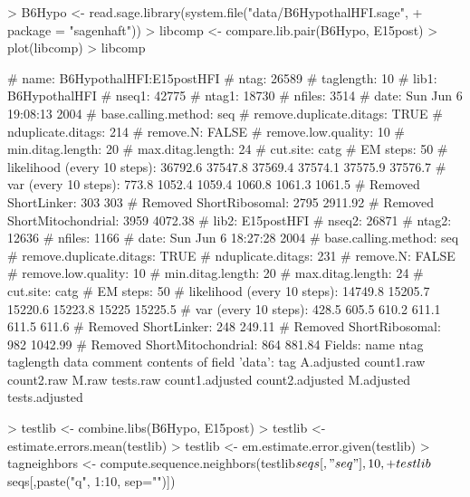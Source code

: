 \documentclass[12pt]{article}
\begin{document}
\begin{Schunk}
\begin{Soutput}
\end{Soutput}
\begin{Sinput}
> B6Hypo <- read.sage.library(system.file("data/B6HypothalHFI.sage", 
+     package = "sagenhaft"))
> libcomp <- compare.lib.pair(B6Hypo, E15post)
> plot(libcomp)
> libcomp
\end{Sinput}
\begin{Soutput}
# name: B6HypothalHFI:E15postHFI
# ntag: 26589
# taglength: 10
# lib1: B6HypothalHFI
# nseq1: 42775
# ntag1: 18730
# nfiles: 3514
# date: Sun Jun  6 19:08:13 2004
# base.calling.method: seq
# remove.duplicate.ditags: TRUE
# nduplicate.ditags: 214
# remove.N: FALSE
# remove.low.quality: 10
# min.ditag.length: 20
# max.ditag.length: 24
# cut.site: catg
# EM steps: 50
# likelihood (every 10 steps): 36792.6 37547.8 37569.4 37574.1 37575.9 37576.7
# var (every 10 steps): 773.8 1052.4 1059.4 1060.8 1061.3 1061.5
# Removed ShortLinker: 303 303
# Removed ShortRibosomal: 2795 2911.92
# Removed ShortMitochondrial: 3959 4072.38
# lib2: E15postHFI
# nseq2: 26871
# ntag2: 12636
# nfiles: 1166
# date: Sun Jun  6 18:27:28 2004
# base.calling.method: seq
# remove.duplicate.ditags: TRUE
# nduplicate.ditags: 231
# remove.N: FALSE
# remove.low.quality: 10
# min.ditag.length: 20
# max.ditag.length: 24
# cut.site: catg
# EM steps: 50
# likelihood (every 10 steps): 14749.8 15205.7 15220.6 15223.8 15225 15225.5
# var (every 10 steps): 428.5 605.5 610.2 611.1 611.5 611.6
# Removed ShortLinker: 248 249.11
# Removed ShortRibosomal: 982 1042.99
# Removed ShortMitochondrial: 864 881.84
Fields:
name ntag taglength data comment
contents of field 'data':
tag A.adjusted count1.raw count2.raw M.raw tests.raw count1.adjusted count2.adjusted M.adjusted tests.adjusted

\end{Soutput}
\end{Schunk}

\begin{Schunk}
\begin{Sinput}
> testlib <- combine.libs(B6Hypo, E15post)
> testlib <- estimate.errors.mean(testlib)
> testlib <- em.estimate.error.given(testlib)
> tagneighbors <- compute.sequence.neighbors(testlib$seqs[,"seq"], 10,
+                          testlib$seqs[,paste("q", 1:10, sep="")])
\end{Sinput}
\end{Schunk}
\end{document}
